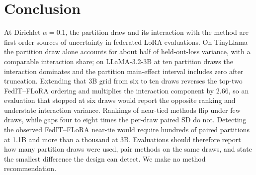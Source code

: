 \section{Conclusion}
\label{sec:conclusion}

At Dirichlet $\alpha{=}0.1$, the partition draw and its interaction with the method are first-order sources of uncertainty in federated LoRA evaluations. On TinyLlama the partition draw alone accounts for about half of held-out-loss variance, with a comparable interaction share; on LLaMA-3.2-3B at ten partition draws the interaction dominates and the partition main-effect interval includes zero after truncation. Extending that 3B grid from six to ten draws reverses the top-two FedIT--FLoRA ordering and multiplies the interaction component by $2.66$, so an evaluation that stopped at six draws would report the opposite ranking and understate interaction variance. Rankings of near-tied methods flip under few draws, while gaps four to eight times the per-draw paired SD do not. Detecting the observed FedIT--FLoRA near-tie would require hundreds of paired partitions at 1.1B and more than a thousand at 3B. Evaluations should therefore report how many partition draws were used, pair methods on the same draws, and state the smallest difference the design can detect. We make no method recommendation.
